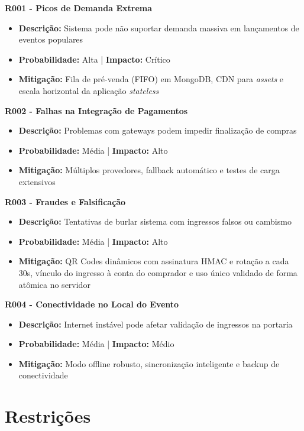 \textbf{R001 - Picos de Demanda Extrema}
\begin{itemize}
    \item \textbf{Descrição:} Sistema pode não suportar demanda massiva em lançamentos de eventos populares
    \item \textbf{Probabilidade:} Alta | \textbf{Impacto:} Crítico
    \item \textbf{Mitigação:} Fila de pré-venda (FIFO) em MongoDB, CDN para \textit{assets} e escala horizontal da aplicação \textit{stateless}
\end{itemize}

\textbf{R002 - Falhas na Integração de Pagamentos}
\begin{itemize}
    \item \textbf{Descrição:} Problemas com gateways podem impedir finalização de compras
    \item \textbf{Probabilidade:} Média | \textbf{Impacto:} Alto
    \item \textbf{Mitigação:} Múltiplos provedores, fallback automático e testes de carga extensivos
\end{itemize}

\textbf{R003 - Fraudes e Falsificação}
\begin{itemize}
    \item \textbf{Descrição:} Tentativas de burlar sistema com ingressos falsos ou cambismo
    \item \textbf{Probabilidade:} Média | \textbf{Impacto:} Alto
    \item \textbf{Mitigação:} QR Codes dinâmicos com assinatura HMAC e rotação a cada 30s, vínculo do ingresso à conta do comprador e uso único validado de forma atômica no servidor
\end{itemize}

\textbf{R004 - Conectividade no Local do Evento}
\begin{itemize}
    \item \textbf{Descrição:} Internet instável pode afetar validação de ingressos na portaria
    \item \textbf{Probabilidade:} Média | \textbf{Impacto:} Médio
    \item \textbf{Mitigação:} Modo offline robusto, sincronização inteligente e backup de conectividade
\end{itemize}

\section{Restrições}

